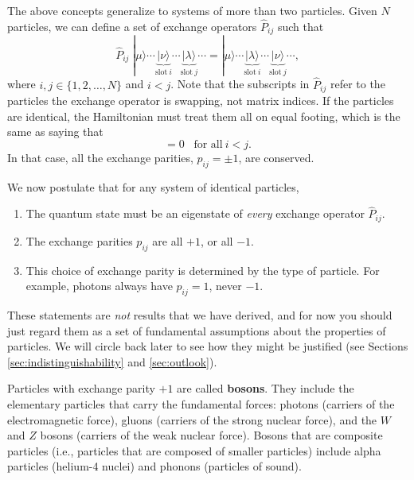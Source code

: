 \documentclass[prx,12pt]{revtex4-2}
\begin{document}
The above concepts generalize to systems of more than two particles.
Given $N$ particles, we can define a set of exchange operators
$\hat{P}_{ij}$ such that
\begin{equation}
  \hat{P}_{ij} \; |\mu\rangle \cdots \underbrace{|\nu\rangle}_{\mathrm{slot}~i} \cdots \underbrace{|\lambda\rangle}_{\mathrm{slot}~j} \cdots
  = |\mu\rangle \cdots \underbrace{|\lambda\rangle}_{\mathrm{slot}~i} \cdots \underbrace{|\nu\rangle}_{\mathrm{slot}~j} \cdots,
\end{equation}
where $i,j\in\{1,2,\dots,N\}$ and $i < j$.  Note that the subscripts
in $\hat{P}_{ij}$ refer to the particles the exchange operator is
swapping, not matrix indices.  If the particles are identical, the
Hamiltonian must treat them all on equal footing, which is the same as
saying that
\begin{equation}
  [\hat{H}, \hat{P}_{ij}] = 0 \;\;\; \textrm{for all}~i < j.
\end{equation}
In that case, all the exchange parities, $p_{ij} = \pm 1$, are
conserved.

\clearpage

We now postulate that for any system of identical particles,
\begin{enumerate}
\item The quantum state must be an eigenstate of \textit{every}
  exchange operator $\hat{P}_{ij}$.

\item The exchange parities $p_{ij}$ are all $+1$, or all $-1$.

\item This choice of exchange parity is determined by the type of
  particle.  For example, photons always have $p_{ij} = 1$, never
  $-1$.
\end{enumerate}
These statements are \textit{not} results that we have derived, and
for now you should just regard them as a set of fundamental
assumptions about the properties of particles.  We will circle back
later to see how they might be justified (see Sections
\ref{sec:indistinguishability} and \ref{sec:outlook}).

Particles with exchange parity $+1$ are called \textbf{bosons}.  They
include the elementary particles that carry the fundamental forces:
photons (carriers of the electromagnetic force), gluons (carriers of
the strong nuclear force), and the $W$ and $Z$ bosons (carriers of the
weak nuclear force).  Bosons that are composite particles (i.e.,
particles that are composed of smaller particles) include alpha
particles (helium-4 nuclei) and phonons (particles of sound).
\end{document}
